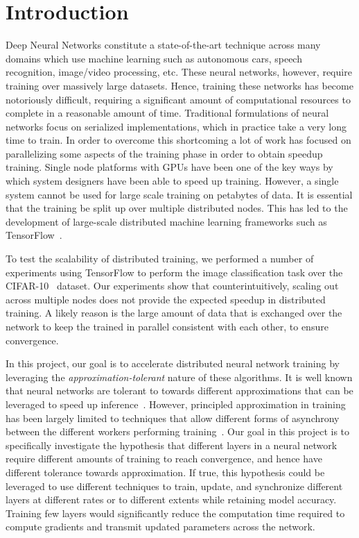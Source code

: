 \section{Introduction}

Deep Neural Networks constitute a state-of-the-art technique across many domains which use machine learning such as autonomous cars, speech recognition, image/video processing, etc. These neural networks, however, require training over massively large datasets. Hence, training these networks has become notoriously difficult, requiring a significant amount of computational resources to complete in a reasonable amount of time. Traditional formulations of neural networks focus on serialized implementations, which in practice take a very long time to train. In order to overcome this shortcoming a lot of work has focused on parallelizing some aspects of the training phase in order to obtain speedup training. Single node platforms with GPUs have been one of the key ways by which system designers have been able to speed up training. However, a single system cannot be used for large scale training on petabytes of data. It is essential that the training be split up over multiple distributed nodes. This has led to the development of large-scale distributed machine learning frameworks such as TensorFlow~\cite{tensorflow}. 

To test the scalability of distributed training, we performed a number of experiments using TensorFlow to perform the image classification task over the CIFAR-10~\cite{cifar10} dataset. Our experiments show that counterintuitively, scaling out across multiple nodes does not provide the expected speedup in distributed training. A likely reason is the large amount of data that is exchanged over the network to keep the trained in parallel consistent with each other, to ensure convergence. 

In this project, our goal is to accelerate distributed neural network training by leveraging the \emph{approximation-tolerant} nature of these algorithms. It is well known that neural networks are tolerant to towards different approximations that can be leveraged to speed up inference~\cite{compresseddnn}\cite{eie}. However, principled approximation in training has been largely limited to techniques that allow different forms of asynchrony between the different workers performing training~\cite{ganger,garth,communicationthesis}. Our goal in this project is to specifically investigate the hypothesis that different layers in a neural network require different amounts of training to reach convergence, and hence have different tolerance towards approximation. If true, this hypothesis could be leveraged to use different techniques to train, update, and synchronize different layers at different rates or to different extents while retaining model accuracy. Training few layers would significantly reduce the computation time required to compute gradients and transmit updated parameters across the network.  

